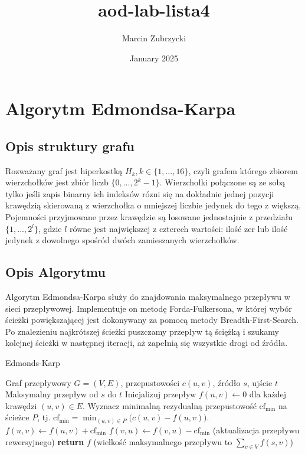 \documentclass{article}
\title{aod-lab-lista4}
\author{Marcin Zubrzycki}
\date{January 2025}
\begin{document}
\maketitle


\section*{Algorytm Edmondsa-Karpa}
\subsection*{Opis struktury grafu}
Rozważany graf jest hiperkostką $H_k, k\in \{1,...,16\}$, czyli grafem którego zbiorem wierzchołków jest zbiór liczb $\{0,...,2^{k}-1\}$. Wierzchołki połączone są ze sobą tylko jeśli zapis binarny ich indeksów rózni się na dokładnie jednej pozycji krawędzią skierowaną z wierzchołka o mniejszej liczbie jedynek do tego z większą. Pojemności przyjmowane przez krawędzie są losowane jednostajnie z przedziału $\{1,...,2^l\}$, gdzie $l$ równe jest największej z czterech wartości: ilość zer lub ilość jedynek z dowolnego spośród dwóch zamieszanych wierzchołków.
\subsection*{Opis Algorytmu}
Algorytm Edmondsa-Karpa służy do znajdowania maksymalnego przepływu w sieci przepływowej. Implementuje on metodę Forda-Fulkersona, w której wybór ścieżki powiększającej jest dokonywany za pomocą metody Breadth-First-Search. 
Po znalezieniu najkrótszej ścieżki puszczamy przepływ tą ściężką i szukamy kolejnej ścieżki w następnej iteracji, aż zapełnią się wszystkie drogi od źródła.
\begin{algorithm}[H]
  \caption{Edmonds-Karp}
  \label{alg:edmonds-karp}
  \begin{algorithmic}[1]
  \REQUIRE Graf przepływowy $G=(V,E)$, przepustowości $c(u,v)$, źródło $s$, ujście $t$
  \ENSURE Maksymalny przepływ od $s$ do $t$
  \STATE Inicjalizuj przepływ $f(u,v) \leftarrow 0$ dla każdej krawędzi $(u,v) \in E$.
    \STATE Wyznacz minimalną rezydualną przepustowość $\text{cf}_{\min}$ na ścieżce $P$, 
           tj. $\text{cf}_{\min} = \min_{(u,v) \in P} \bigl(c(u,v) - f(u,v)\bigr)$.
      \STATE $f(u,v) \leftarrow f(u,v) + \text{cf}_{\min}$ 
      \STATE $f(v,u) \leftarrow f(v,u) - \text{cf}_{\min}$ \quad (aktualizacja przepływu rewersyjnego)
    \ENDFOR
  \ENDWHILE
  \STATE \textbf{return} $f$ \quad (wielkość maksymalnego przepływu to $\sum_{v\in V} f(s,v)$)
  \end{algorithmic}
  \end{algorithm}
\end{document}
